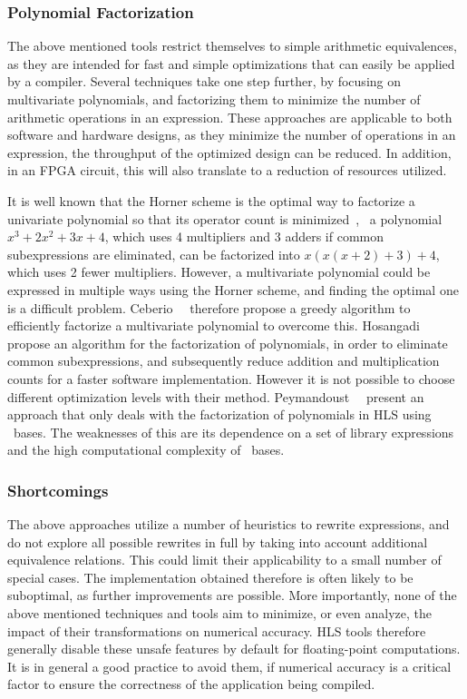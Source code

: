 \subsubsection{Polynomial Factorization}

The above mentioned tools restrict themselves to simple arithmetic
equivalences, as they are intended for fast and simple optimizations that can
easily be applied by a compiler.  Several techniques take one step further,
by focusing on multivariate polynomials, and factorizing them to minimize
the number of arithmetic operations in an expression.  These approaches are
applicable to both software and hardware designs, as they minimize the number
of operations in an expression, the throughput of the optimized design can
be reduced.  In addition, in an FPGA circuit, this will also translate to a
reduction of resources utilized.

It is well known that the Horner scheme is the optimal way to
factorize a univariate polynomial so that its operator count is
minimized~\cite{neumaier01}, \eg~a polynomial $x^3 + 2x^2 + 3x + 4$,
which uses 4 multipliers and 3 adders if common subexpressions are
eliminated, can be factorized into $x(x(x + 2) + 3) + 4$, which uses 2
fewer multipliers.  However, a multivariate polynomial could be expressed
in multiple ways using the Horner scheme, and finding the optimal one is
a difficult problem.  Ceberio~\etal~\cite{ceberio04} therefore propose a
greedy algorithm to efficiently factorize a multivariate polynomial to
overcome this.  Hosangadi~\etal~\cite{hosangadi} propose an algorithm for the
factorization of polynomials, in order to eliminate common subexpressions, and
subsequently reduce addition and multiplication counts for a faster software
implementation.  However it is not possible to choose different optimization
levels with their method.  Peymandoust~\etal~\cite{peymandoust} present an
approach that only deals with the factorization of polynomials in HLS using
\groebner~bases.  The weaknesses of this are its dependence on a set of
library expressions~\cite{hosangadi} and the high computational complexity of
\groebner~bases.

\subsubsection{Shortcomings}

The above approaches utilize a number of heuristics to rewrite expressions, and
do not explore all possible rewrites in full by taking into account additional
equivalence relations.  This could limit their applicability to a small number
of special cases.  The implementation obtained therefore is often likely
to be suboptimal, as further improvements are possible.  More importantly,
none of the above mentioned techniques and tools aim to minimize, or even
analyze, the impact of their transformations on numerical accuracy.  HLS tools
therefore generally disable these unsafe features by default for floating-point
computations.  It is in general a good practice to avoid them, if numerical
accuracy is a critical factor to ensure the correctness of the application
being compiled.

